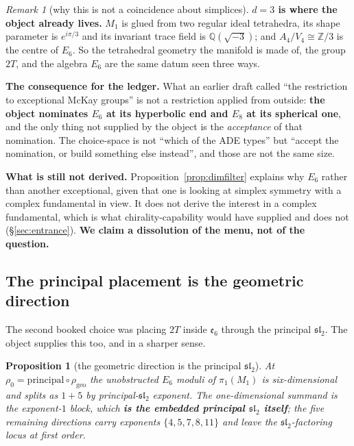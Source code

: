 \documentclass[11pt,reqno]{amsart}
\theoremstyle{plain}
\newtheorem{proposition}[theorem]{Proposition}
\theoremstyle{definition}
\theoremstyle{remark}
\newtheorem{remark}[theorem]{Remark}
\newcommand{\Q}{\mathbb{Q}}
\newcommand{\Z}{\mathbb{Z}}
\newcommand{\sll}{\mathfrak{sl}}
\newcommand{\ee}{\mathfrak{e}}
\begin{document}
\begin{remark}[why this is not a coincidence about simplices]\label{rem:nomination}
\textbf{$d=3$ is where the object already lives.} $M_1$ is glued from two regular ideal
tetrahedra, its shape parameter is $e^{i\pi/3}$ and its invariant trace field is
$\Q(\sqrt{-3})$; and $A_4/V_4\cong\Z/3$ is the centre of $E_6$. So the tetrahedral
geometry the manifold is made of, the group $2T$, and the algebra $E_6$ are the same
datum seen three ways.

\textbf{The consequence for the ledger.} What an earlier draft called ``the restriction
to exceptional McKay groups'' is not a restriction applied from outside: \textbf{the
object nominates $E_6$ at its hyperbolic end and $E_8$ at its spherical one}, and the
only thing not supplied by the object is the \emph{acceptance} of that nomination. The
choice-space is not ``which of the ADE types'' but ``accept the nomination, or build
something else instead'', and those are not the same size.

\textbf{What is still not derived.} Proposition~\ref{prop:dimfilter} explains why $E_6$
rather than another exceptional, given that one is looking at simplex symmetry with a
complex fundamental in view. It does not derive the interest in a complex fundamental,
which is what chirality-capability would have supplied and does not
(\S\ref{sec:entrance}). \textbf{We claim a dissolution of the menu, not of the question.}
\end{remark}

\subsection{The principal placement is the geometric direction}\label{sec:principaldir}

The second booked choice was placing $2T$ inside $\ee_6$ through the principal $\sll_2$.
The object supplies this too, and in a sharper sense.

\begin{proposition}[the geometric direction is the principal $\sll_2$]\label{prop:geodir}
At $\rho_0=\text{principal}\circ\rho_{\mathrm{geo}}$ the unobstructed $E_6$ moduli of
$\pi_1(M_1)$ is six-dimensional and splits as $1+5$ by principal-$\sll_2$ exponent. The
one-dimensional summand is the exponent-$1$ block, which \textbf{is the embedded
principal $\sll_2$ itself}; the five remaining directions carry exponents
$\{4,5,7,8,11\}$ and leave the $\sll_2$-factoring locus at first order.
\end{proposition}
\end{document}
